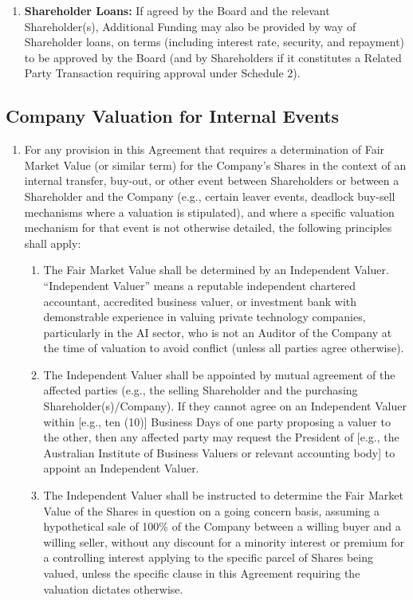\begin{enumerate}[label=(\alph*)]
\item \textbf{Shareholder Loans:} If agreed by the Board and the relevant Shareholder(s), Additional Funding may also be provided by way of Shareholder loans, on terms (including interest rate, security, and repayment) to be approved by the Board (and by Shareholders if it constitutes a Related Party Transaction requiring approval under Schedule 2).
\end{enumerate}

\subsection{Company Valuation for Internal Events} \label{subsec:CompanyValuationInternal}
\begin{enumerate}[label=(\alph*)]
\item For any provision in this Agreement that requires a determination of Fair Market Value (or similar term) for the Company's Shares in the context of an internal transfer, buy-out, or other event between Shareholders or between a Shareholder and the Company (e.g., certain leaver events, deadlock buy-sell mechanisms where a valuation is stipulated), and where a specific valuation mechanism for that event is not otherwise detailed, the following principles shall apply:
    \begin{enumerate}[label=(\roman*)]
    \item The Fair Market Value shall be determined by an Independent Valuer. ``Independent Valuer'' means a reputable independent chartered accountant, accredited business valuer, or investment bank with demonstrable experience in valuing private technology companies, particularly in the AI sector, who is not an Auditor of the Company at the time of valuation to avoid conflict (unless all parties agree otherwise).
    \item The Independent Valuer shall be appointed by mutual agreement of the affected parties (e.g., the selling Shareholder and the purchasing Shareholder(s)/Company). If they cannot agree on an Independent Valuer within [e.g., ten (10)] Business Days of one party proposing a valuer to the other, then any affected party may request the President of [e.g., the Australian Institute of Business Valuers or relevant accounting body] to appoint an Independent Valuer.
    \item The Independent Valuer shall be instructed to determine the Fair Market Value of the Shares in question on a going concern basis, assuming a hypothetical sale of 100\% of the Company between a willing buyer and a willing seller, without any discount for a minority interest or premium for a controlling interest applying to the specific parcel of Shares being valued, unless the specific clause in this Agreement requiring the valuation dictates otherwise.

\end{enumerate}
\end{enumerate}
